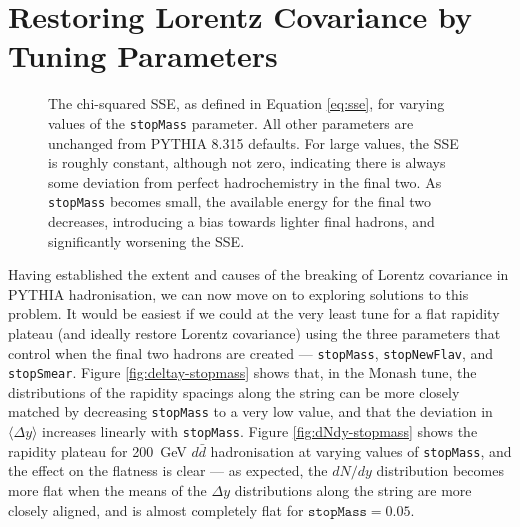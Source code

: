 \documentclass[12pt,a4paper]{report}
\begin{document}
\section{Restoring Lorentz Covariance by Tuning Parameters}
\begin{figure}
  \centering
  \begin{minipage}[t]{0.48\linewidth}
    \centering
    
    \caption{Rapidity plateaus for values of \texttt{stopMass} ranging from 0.05 to 2.0, with all other parameters kept at PYTHIA 8.315 defaults. Small values give an almost flat plateau, since the rapidity spacing distributions along the string are roughly aligned when the kinetic energy available for the final two is low. As \texttt{stopMass} increases and the discrepancy in $\Delta y$ becomes more pronounced, the dip in the plateau becomes larger.}
    \label{fig:dNdy-stopmass}
  \end{minipage}
  \hfill
  \begin{minipage}[t]{0.48\linewidth}
    \centering
    
    \caption{The chi-squared SSE, as defined in Equation \eqref{eq:sse}, for varying values of the \texttt{stopMass} parameter. All other parameters are unchanged from PYTHIA 8.315 defaults. For large values, the SSE is roughly constant, although not zero, indicating there is always some deviation from perfect hadrochemistry in the final two. As \texttt{stopMass} becomes small, the available energy for the final two decreases, introducing a bias towards lighter final hadrons, and significantly worsening the SSE.}
    \label{fig:sse-stopmass}
  \end{minipage}
\end{figure}

Having established the extent and causes of the breaking of Lorentz covariance in PYTHIA hadronisation, we can now move on to exploring solutions to this problem. It would be easiest if we could at the very least tune for a flat rapidity plateau (and ideally restore Lorentz covariance) using the three parameters that control when the final two hadrons are created --- \texttt{stopMass}, \texttt{stopNewFlav}, and \texttt{stopSmear}. Figure \ref{fig:deltay-stopmass} shows that, in the Monash tune, the distributions of the rapidity spacings along the string can be more closely matched by decreasing \texttt{stopMass} to a very low value, and that the deviation in $\langle \Delta y \rangle$ increases linearly with \texttt{stopMass}. Figure \ref{fig:dNdy-stopmass} shows the rapidity plateau for \qty{200}{\giga\electronvolt} $d\bar{d}$ hadronisation at varying values of \texttt{stopMass}, and the effect on the flatness is clear --- as expected, the $dN/dy$ distribution becomes more flat when the means of the $\Delta y$ distributions along the string are more closely aligned, and is almost completely flat for $\texttt{stopMass} = 0.05$.
\end{document}
